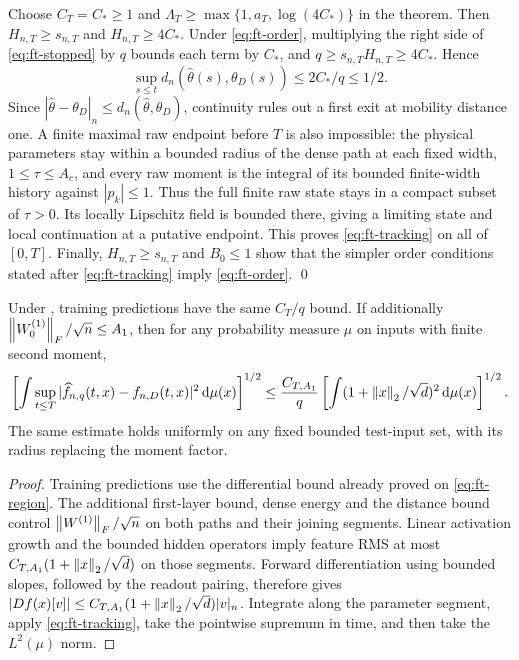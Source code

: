 Choose $C_T=C_*\ge1$ and
$\Lambda_T\ge\max\{1,a_T,\log(4C_*)\}$ in the theorem.
Then $H_{n,T}\ge s_{n,T}$ and $H_{n,T}\ge4C_*$.
Under \eqref{eq:ft-order}, multiplying the right side of
\eqref{eq:ft-stopped} by $q$ bounds each term by $C_*$, and
$q\ge s_{n,T}H_{n,T}\ge4C_*$.  Hence
\[
 \sup_{s\le t}d_n(\widehat\theta(s),\theta_D(s))
          \le2C_*/q\le1/2.
\]
Since $|\widehat\theta-\theta_D|_n\le d_n(\widehat\theta,\theta_D)$,
continuity rules out a first exit at mobility distance one.  A finite maximal raw
endpoint before $T$ is also impossible: the physical parameters stay
within a bounded radius of the dense path at each fixed width,
$1\le\tau\le A_c$, and every raw moment is the integral of its bounded
finite-width history against $|p_k|\le1$.  Thus the full finite raw state
stays in a compact subset of $\tau>0$.  Its locally Lipschitz field is
bounded there, giving a limiting state and local continuation at a
putative endpoint.  This proves \eqref{eq:ft-tracking} on all of $[0,T]$.
Finally, $H_{n,T}\ge s_{n,T}$ and $B_0\le1$ show that the simpler order
conditions stated after \eqref{eq:ft-tracking} imply
\eqref{eq:ft-order}. \qed

\begin{corollary}[Predictions]
\label{cor:finite-time-predictions}
Under , training predictions have the same
$C_T/q$ bound.  If additionally
$\left\lVert W_0^{(1)}\right\rVert_F/\sqrt n\le A_1$, then for any probability measure
$\mu$ on inputs with finite second moment,
\[
 \left[\int\sup_{t\le T}
  |\widehat f_{n,q}(t,x)-f_{n,D}(t,x)|^2\,\mathrm{d}\mu(x)\right]^{1/2}
 \le\frac{C_{T,A_1}}{q}
       \left[\int(1+\left\lVert x\right\rVert_2/\sqrt d)^2\,\mathrm{d}\mu(x)\right]^{1/2}.
\]
The same estimate holds uniformly on any fixed bounded test-input set,
with its radius replacing the moment factor.
\end{corollary}
\begin{proof}
Training predictions use the differential bound already proved on
\eqref{eq:ft-region}.  The additional first-layer bound, dense energy and
the distance bound control $\left\lVert W^{(1)}\right\rVert_F/\sqrt n$ on both paths and
their joining segments.  Linear activation growth and the bounded
hidden operators imply feature RMS at most
$C_{T,A_1}(1+\left\lVert x\right\rVert_2/\sqrt d)$ on those segments.  Forward
differentiation using bounded slopes, followed by the readout pairing,
therefore gives
$|Df(x)[v]|\le C_{T,A_1}(1+\left\lVert x\right\rVert_2/\sqrt d)|v|_n$.
Integrate along the parameter segment, apply
\eqref{eq:ft-tracking}, take the pointwise supremum in time, and then
take the $L^2(\mu)$ norm.
\end{proof}

